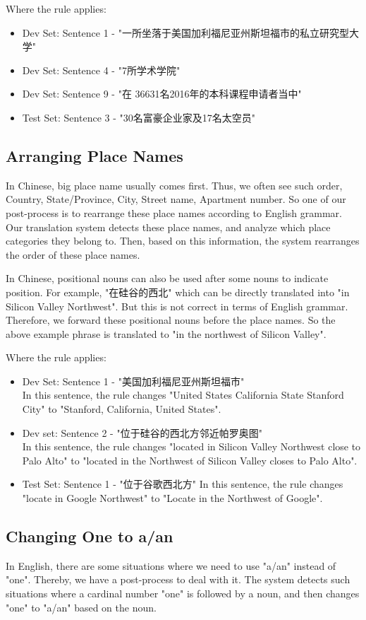 \documentclass[11pt]{article} %
\begin{document}
\begin{CJK}{UTF8}{gbsn}
Where the rule applies:
\begin{itemize}
\item Dev Set: Sentence 1 - "一所坐落于美国加利福尼亚州斯坦福市的私立研究型大学"
\item Dev Set: Sentence 4 - "7所学术学院"
\item Dev Set: Sentence 9 - "在 36631名2016年的本科课程申请者当中"
\item Test Set: Sentence 3 - "30名富豪企业家及17名太空员"
\end{itemize}

\subsection{Arranging Place Names}
In Chinese, big place name usually comes first. Thus, we often see such order, Country, State/Province, City, Street name, Apartment number. So one of our post-process is to rearrange these place names according to English grammar. Our translation system detects these place names, and analyze which place categories they belong to. Then, based on this information, the system rearranges the order of these place names.

In Chinese, positional nouns can also be used after some nouns to indicate position. For example, "在硅谷的西北" which can be directly translated into "in Silicon Valley Northwest". But this is not correct in terms of English grammar. Therefore, we forward these positional nouns before the place names. So the above example phrase is translated to "in the northwest of Silicon Valley".

Where the rule applies:
\begin{itemize}
\item Dev Set: Sentence 1 - "美国加利福尼亚州斯坦福市"\\
In this sentence, the rule changes "United States California State Stanford City" to "Stanford, California, United States".
\item Dev set: Sentence 2 - "位于硅谷的西北方邻近帕罗奥图"\\
In this sentence, the rule changes "located in Silicon Valley Northwest close to Palo Alto" to "located in the Northwest of Silicon Valley closes to Palo Alto".
\item Test Set: Sentence 1 - "位于谷歌西北方"
In this sentence, the rule changes "locate in Google Northwest" to "Locate in the Northwest of Google".
\end{itemize}

\subsection{Changing One to a/an}
In English, there are some situations where we need to use "a/an" instead of "one". Thereby, we have a post-process to deal with it. The system detects such situations where a cardinal number "one" is followed by a noun, and then changes "one" to "a/an" based on the noun. 


\end{CJK}
\end{document}
